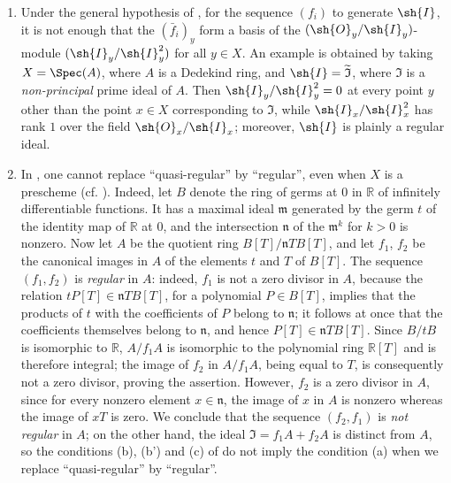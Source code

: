 \begin{remarks}[16.9.6]
\label{IV.16.9.6}
\begin{enumerate}
  \item[\rm{(i)}] Under the general hypothesis of , for the sequence $(f_i)$ to generate $\sh{I}$, it is not enough that the $(\bar f_i)_y$ form a basis of the $(\sh{O}_y/\sh{I}_y)$-module $(\sh{I}_y/\sh{I}_y^2)$ for all $y \in X$.
  An example is obtained by
  taking $X = \Spec(A)$, where $A$ is a Dedekind ring, and $\sh{I} = \widetilde{\mathfrak{I}}$, where $\mathfrak{I}$ is a \emph{non-principal} prime ideal of $A$.
  Then $\sh{I}_y/\sh{I}_y^2 = 0$ at every point $y$ other than the point $x \in X$ corresponding to $\mathfrak{I}$, while $\sh{I}_x/\sh{I}_x^2$ has rank $1$ over the field $\sh{O}_x/\sh{I}_x$;
  moreover, $\sh{I}$ is plainly a regular ideal.

  \item[\rm{(ii)}] In , one cannot replace ``quasi-regular'' by ``regular'', even when $X$ is a prescheme (cf. ).
  Indeed, let $B$ denote the ring of germs at $0$ in $\mathbb{R}$ of infinitely differentiable functions.
  It has a maximal ideal $\mathfrak{m}$ generated by the germ $t$ of the identity map of $\mathbb{R}$ at $0$, and the intersection $\mathfrak{n}$ of the $\mathfrak{m}^k$ for $k>0$ is nonzero.
  Now let $A$ be the quotient ring $B[T]/\mathfrak{n}TB[T]$, and let $f_1$, $f_2$ be the canonical images in $A$ of the elements $t$ and $T$ of $B[T]$.
  The sequence $(f_1, f_2)$ is \emph{regular} in $A$: indeed, $f_1$ is not a zero divisor in $A$, because the relation $tP[T] \in \mathfrak{n}TB[T]$, for a polynomial $P \in B[T]$, implies that the products of $t$ with the coefficients of $P$ belong to $\mathfrak{n}$; it follows at once that the coefficients themselves belong to $\mathfrak{n}$, and hence $P[T] \in \mathfrak{n}TB[T]$.
  Since $B/tB$ is isomorphic to $\mathbb{R}$, $A/f_1A$ is isomorphic to the polynomial ring $\mathbb{R}[T]$ and is therefore integral; the image of $f_2$ in $A/f_1A$, being equal to $T$, is consequently not a zero divisor, proving the assertion.
  However, $f_2$ is a zero divisor in $A$, since for every nonzero element $x \in \mathfrak{n}$, the image of $x$ in $A$ is nonzero whereas the image of $xT$ is zero.
  We conclude that the sequence $(f_2, f_1)$ is \emph{not regular} in $A$;
  on the other hand, the ideal $\mathfrak{I} = f_1A + f_2A$ is distinct from $A$, so the conditions (b), (b') and (c) of  do not imply the condition (a) when we replace ``quasi-regular'' by ``regular''.
\end{enumerate}
\end{remarks}

